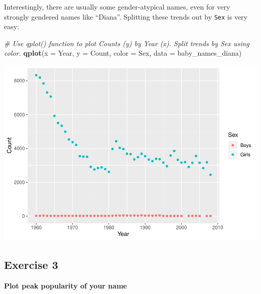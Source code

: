 \documentclass[]{book}
\newenvironment{Shaded}{\begin{snugshade}}{\end{snugshade}}
\newcommand{\CommentTok}[1]{\textcolor[rgb]{0.56,0.35,0.01}{\textit{#1}}}
\newcommand{\DataTypeTok}[1]{\textcolor[rgb]{0.13,0.29,0.53}{#1}}
\newcommand{\KeywordTok}[1]{\textcolor[rgb]{0.13,0.29,0.53}{\textbf{#1}}}
\newcommand{\NormalTok}[1]{#1}
\begin{document}
Interestingly, there are usually some gender-atypical names, even for very strongly
gendered names like ``Diana''. Splitting these trends out by \texttt{Sex} is very easy:

\begin{Shaded}
\begin{Highlighting}[]
\CommentTok{# Use qplot() function to plot Counts (y) by Year (x). Split trends by Sex using color.}
\KeywordTok{qplot}\NormalTok{(}\DataTypeTok{x =}\NormalTok{ Year, }\DataTypeTok{y =}\NormalTok{ Count, }\DataTypeTok{color =}\NormalTok{ Sex,}
      \DataTypeTok{data =}\NormalTok{ baby_names_diana)}
\end{Highlighting}
\end{Shaded}

\includegraphics{R/Rintro/figures/unnamed-chunk-43-1.pdf}

\hypertarget{exercise-3}{%
\subsection{Exercise 3}\label{exercise-3}}

\textbf{Plot peak popularity of your name}
\end{document}
